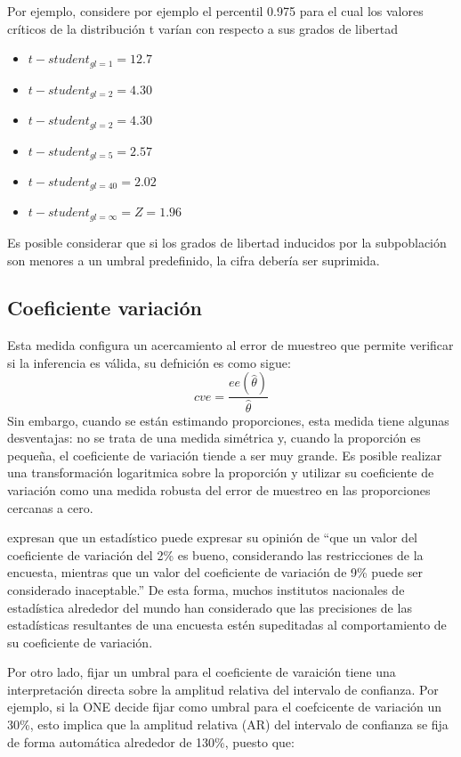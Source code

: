 Por ejemplo, considere por ejemplo el percentil 0.975 para el cual los valores críticos de la distribución t varían con respecto a sus grados de libertad

\begin{itemize}
\tightlist
\item
  \(t-student_{gl = 1} = 12.7\)
\item
  \(t-student_{gl = 2} = 4.30\)
\item
  \(t-student_{gl = 2} = 4.30\)
\item
  \(t-student_{gl = 5} = 2.57\)
\item
  \(t-student_{gl = 40} = 2.02\)
\item
  \(t-student_{gl = \infty} = Z = 1.96\)
\end{itemize}

Es posible considerar que si los grados de libertad inducidos por la subpoblación son menores a un umbral predefinido, la cifra debería ser suprimida.

\hypertarget{coeficiente-variacion}{%
\subsection*{Coeficiente variación}\label{coeficiente-variacion}}


Esta medida configura un acercamiento al error de muestreo que permite verificar si la inferencia es válida, su defnición es como sigue:
\[
cve = \frac{ee(\hat\theta)}{\hat\theta}
\]
Sin embargo, cuando se están estimando proporciones, esta medida tiene algunas desventajas: no se trata de una medida simétrica y, cuando la proporción es pequeña, el coeficiente de variación tiende a ser muy grande. Es posible realizar una transformación logaritmica sobre la proporción y utilizar su coeficiente de variación como una medida robusta del error de muestreo en las proporciones cercanas a cero.

\citet{Sarndal_Swensson_Wretman_2003} expresan que un estadístico puede expresar su opinión de ``que un valor del coeficiente de variación del 2\% es bueno, considerando las restricciones de la encuesta, mientras que un valor del coeficiente de variación de 9\% puede ser considerado inaceptable.'' De esta forma, muchos institutos nacionales de estadística alrededor del mundo han considerado que las precisiones de las estadísticas resultantes de una encuesta estén supeditadas al comportamiento de su coeficiente de variación.

Por otro lado, fijar un umbral para el coeficiente de varaición tiene una interpretación directa sobre la amplitud relativa del intervalo de confianza. Por ejemplo, si la ONE decide fijar como umbral para el coefcicente de variación un 30\%, esto implica que la amplitud relativa (AR) del intervalo de confianza se fija de forma automática alrededor de 130\%, puesto que:

